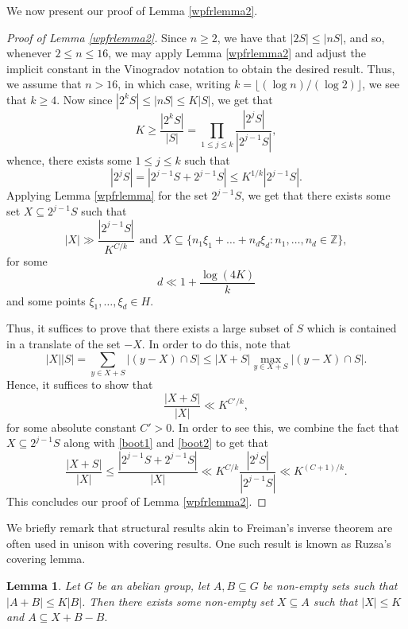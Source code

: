\documentclass[12pt, reqno]{amsart}
\newtheorem{lemma}[theorem]{Lemma}
\theoremstyle{remark}
\theoremstyle{definition}
\numberwithin{equation}{section}
\begin{document}
We now present our proof of Lemma \ref{wpfrlemma2}.

\begin{proof}[Proof of Lemma \ref{wpfrlemma2}]
 Since $n \geq 2$, we have that $|2S| \leq |nS|$, and so, whenever $2 \leq n \leq 16$, we may apply Lemma \ref{wpfrlemma2} and adjust the implicit constant in the Vinogradov notation to obtain the desired result. Thus, we assume that $n > 16$, in which case, writing $k = \lfloor (\log n)/(\log 2) \rfloor$, we see that $k \geq 4$. Now since $|2^k S| \leq |nS | \leq K |S|$, we get that
 \[ K \geq \frac{|2^k S|}{|S|} = \prod_{1 \leq j \leq k} \frac{|2^j S|}{|2^{j-1}S|}, \]
 whence, there exists some $1 \leq j \leq k$ such that
 \begin{equation} \label{boot1}
|2^j S| =  |2^{j-1}S + 2^{j-1} S| \leq K^{1/k} |2^{j-1} S|. 
 \end{equation}
 Applying Lemma \ref{wpfrlemma} for the set $2^{j-1}S$, we get that there exists some set $X \subseteq 2^{j-1}S$ such that
 \begin{equation} \label{boot2}
 |X| \gg \frac{|2^{j-1} S|}{ K^{C/k} } \ \ \text{and} \ \ X \subseteq \{ n_1 \xi_1 + \dots + n_d \xi_d : n_1, \dots, n_d \in \mathbb{Z} \} ,
 \end{equation}
 for some 
 \[ d \ll 1 + \frac{ \log (4K) }{k} \]
and some points $\xi_1, \dots, \xi_d \in H$.


 Thus, it suffices to prove that there exists a large subset of $S$ which is contained in a translate of the set $-X$. In order to do this, note that
 \[ |X||S| = \sum_{y \in X+ S}  |(y-X) \cap S| \leq |X+S| \max_{y \in X+S} |(y-X)\cap S|.  \]
 Hence, it suffices to show that 
 \[ \frac{|X + S|}{|X|} \ll K^{C'/k},\]
 for some absolute constant $C'>0$. In order to see this, we combine the fact that $X \subseteq 2^{j-1} S$ along with \eqref{boot1} and \eqref{boot2} to get that
\[ 
      \frac{|X+S|}{|X|} \leq \frac{|2^{j-1}S + 2^{j-1}S|}{|X|} \ll K^{C/k} \frac{|2^j S|}{|2^{j-1}S|} \ll K^{(C+1)/k}.
\]
 This concludes our proof of Lemma \ref{wpfrlemma2}.
\end{proof}



We briefly remark that structural results akin to Freiman's inverse theorem are often used in unison with covering results. One such result is known as Ruzsa's covering lemma. 

\begin{lemma} \label{rcl}
    Let $G$ be an abelian group, let $A, B \subseteq G$ be non-empty sets such that $|A+B| \leq K|B|$. Then there exists some non-empty set $X \subseteq A$ such that $|X| \leq K$ and $A \subseteq X + B - B.$  
\end{lemma}
\end{document}
